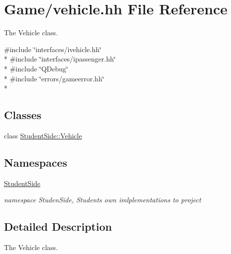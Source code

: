 \hypertarget{vehicle_8hh}{\section{Game/vehicle.hh File Reference}
\label{vehicle_8hh}
}


The Vehicle class.  


{\ttfamily \#include \char`\"{}interfaces/ivehicle.\-hh\char`\"{}}\\*
{\ttfamily \#include \char`\"{}interfaces/ipassenger.\-hh\char`\"{}}\\*
{\ttfamily \#include \char`\"{}Q\-Debug\char`\"{}}\\*
{\ttfamily \#include \char`\"{}errors/gameerror.\-hh\char`\"{}}\\*
\subsection*{Classes}
\begin{DoxyCompactItemize}
\item 
class \hyperlink{class_student_side_1_1_vehicle}{Student\-Side\-::\-Vehicle}
\end{DoxyCompactItemize}
\subsection*{Namespaces}
\begin{DoxyCompactItemize}
\item 
\hyperlink{namespace_student_side}{Student\-Side}
\begin{DoxyCompactList}\small\item\em namespace Studen\-Side, Students own imlplementations to project \end{DoxyCompactList}\end{DoxyCompactItemize}


\subsection{Detailed Description}
The Vehicle class. 